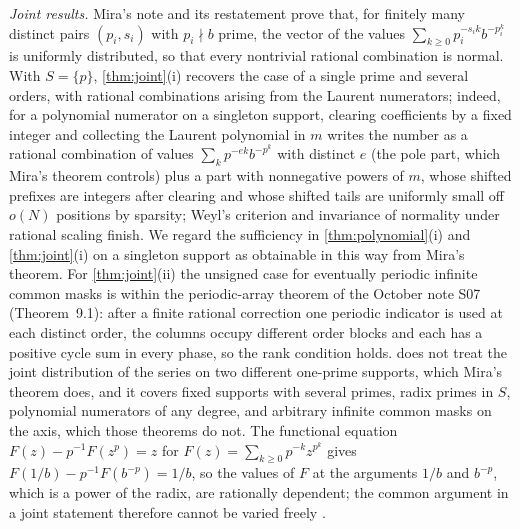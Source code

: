 \documentclass[11pt]{article}
\begin{document}
\emph{Joint results.} Mira's note \cite[S09, Theorem~2]{mira} and its restatement \cite[Theorem~1]{miracult} prove that, for finitely many distinct pairs $(p_i,s_i)$ with $p_i\nmid b$ prime, the vector of the values $\sum_{k\ge0}p_i^{-s_ik}b^{-p_i^k}$ is uniformly distributed, so that every nontrivial rational combination is normal. With $S=\{p\}$, \cref{thm:joint}(i) recovers the case of a single prime and several orders, with rational combinations arising from the Laurent numerators; indeed, for a polynomial numerator on a singleton support, clearing coefficients by a fixed integer and collecting the Laurent polynomial in $m$ writes the number as a rational combination of values $\sum_kp^{-ek}b^{-p^k}$ with distinct $e$ (the pole part, which Mira's theorem controls) plus a part with nonnegative powers of $m$, whose shifted prefixes are integers after clearing and whose shifted tails are uniformly small off $o(N)$ positions by sparsity; Weyl's criterion and invariance of normality under rational scaling finish. We regard the sufficiency in \cref{thm:polynomial}(i) and \cref{thm:joint}(i) on a singleton support as obtainable in this way from Mira's theorem. For \cref{thm:joint}(ii) the unsigned case for eventually periodic infinite common masks is within the periodic-array theorem of the October note S07 (Theorem~9.1): after a finite rational correction one periodic indicator is used at each distinct order, the columns occupy different order blocks and each has a positive cycle sum in every phase, so the rank condition holds.  does not treat the joint distribution of the series on two different one-prime supports, which Mira's theorem does, and it covers fixed supports with several primes, radix primes in $S$, polynomial numerators of any degree, and arbitrary infinite common masks on the axis, which those theorems do not. The functional equation $F(z)-p^{-1}F(z^p)=z$ for $F(z)=\sum_{k\ge0}p^{-k}z^{p^k}$ gives $F(1/b)-p^{-1}F(b^{-p})=1/b$, so the values of $F$ at the arguments $1/b$ and $b^{-p}$, which is a power of the radix, are rationally dependent; the common argument in a joint statement therefore cannot be varied freely \cite{mira,miracult}.
\end{document}
